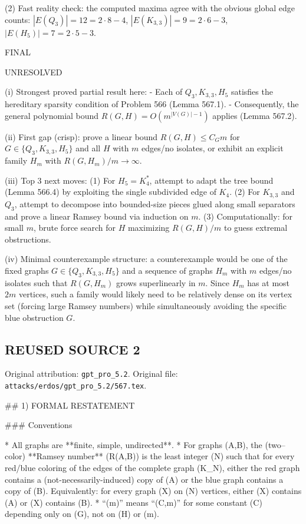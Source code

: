 (2) Fast reality check: the computed maxima agree with the obvious global edge counts:
$|E(Q_3)|=12=2\cdot 8-4$, $|E(K_{3,3})|=9=2\cdot 6-3$, $|E(H_5)|=7=2\cdot 5-3$.

FINAL

UNRESOLVED

(i) Strongest proved partial result here:
- Each of $Q_3,K_{3,3},H_5$ satisfies the hereditary sparsity condition of Problem 566 (Lemma 567.1).
- Consequently, the general polynomial bound $R(G,H)=O(m^{|V(G)|-1})$ applies (Lemma 567.2).

(ii) First gap (crisp): prove a linear bound $R(G,H)\le C_G m$ for $G\in\{Q_3,K_{3,3},H_5\}$ and all $H$ with $m$ edges/no isolates, or exhibit an explicit family $H_m$ with $R(G,H_m)/m\to\infty$.

(iii) Top 3 next moves:
(1) For $H_5=K_4^*$, attempt to adapt the tree bound (Lemma 566.4) by exploiting the single subdivided edge of $K_4$.
(2) For $K_{3,3}$ and $Q_3$, attempt to decompose into bounded-size pieces glued along small separators and prove a linear Ramsey bound via induction on $m$.
(3) Computationally: for small $m$, brute force search for $H$ maximizing $R(G,H)/m$ to guess extremal obstructions.

(iv) Minimal counterexample structure: a counterexample would be one of the fixed graphs $G\in\{Q_3,K_{3,3},H_5\}$ and a sequence of graphs $H_m$ with $m$ edges/no isolates such that $R(G,H_m)$ grows superlinearly in $m$.
Since $H_m$ has at most $2m$ vertices, such a family would likely need to be relatively dense on its vertex set (forcing large Ramsey numbers) while simultaneously avoiding the specific blue obstruction $G$.


\subsection*{REUSED SOURCE 2}
Original attribution: \texttt{gpt\_pro\_5.2}.
Original file: \texttt{attacks/erdos/gpt\_pro\_5.2/567.tex}.

## 1) FORMAL RESTATEMENT

### Conventions

* All graphs are **finite, simple, undirected**.
* For graphs (A,B), the (two–color) **Ramsey number** (R(A,B)) is the least integer (N) such that for every red/blue coloring of the edges of the complete graph (K_N), either the red graph contains a (not-necessarily-induced) copy of (A) or the blue graph contains a copy of (B). Equivalently: for every graph (X) on (N) vertices, either (X) contains (A) or (\overline X) contains (B).
* “(\ll m)” means “(\le C,m)” for some constant (C) depending only on (G), not on (H) or (m).

